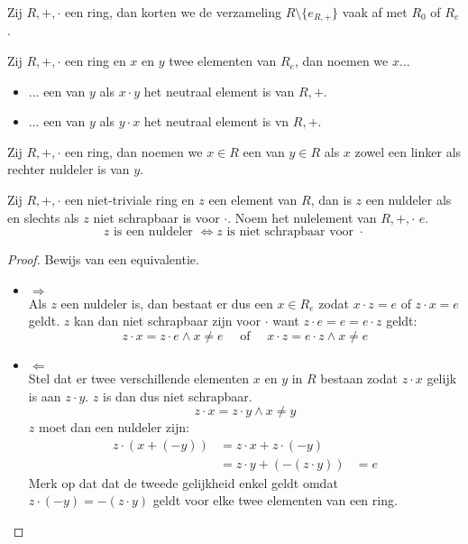 \documentclass[main.tex]{subfiles}
\begin{document}
\begin{de}
  Zij $R,+,\cdot$ een ring, dan korten we de verzameling $R\setminus \{e_{R,+}\}$ vaak af met $R_{0}$ of $R_{e}$.
\end{de}

\begin{de}
  Zij $R,+,\cdot$ een ring en $x$ en $y$ twee elementen van $R_{e}$, dan noemen we $x$...
  \begin{itemize}
  \item ... een  van $y$ als $x\cdot y$ het neutraal element is van $R,+$.
  \item ... een  van $y$ als $y\cdot x$ het neutraal element is vn $R,+$.
  \end{itemize}
\end{de}

\begin{de}
  Zij $R,+,\cdot$ een ring, dan noemen we $x\in R$ een  van $y\in R$ als $x$ zowel een linker als rechter nuldeler is van $y$.
\end{de}

\begin{ei}
  \label{ei:nuldeler-asa-niet-schrapbaar}
  Zij $R,+,\cdot$ een niet-triviale ring en $z$ een element van $R$, dan is $z$ een nuldeler als en slechts als $z$ niet schrapbaar is voor $\cdot$.
  Noem het nulelement van $R,+,\cdot$ $e$.
  \[ z \text{ is een nuldeler } \Leftrightarrow z \text{ is niet schrapbaar voor } \cdot \]
  \begin{proof}
    Bewijs van een equivalentie.
    \begin{itemize}
    \item $\Rightarrow$\\
      Als $z$ een nuldeler is, dan bestaat er dus een $x \in R_{e}$ zodat $x\cdot z= e$ of $z \cdot x = e$ geldt.
      $z$ kan dan niet schrapbaar zijn voor $\cdot$ want $z\cdot e = e = e \cdot z$ geldt:
      \[ z \cdot x = z \cdot e \wedge x \neq e \quad\text{ of }\quad x \cdot z = e \cdot z \wedge x \neq e \]
    \item $\Leftarrow$\\
      Stel dat er twee verschillende elementen $x$ en $y$ in $R$ bestaan zodat $z \cdot x$ gelijk is aan $z \cdot y$.
      $z$ is dan dus niet schrapbaar.
      \[ z \cdot x = z \cdot y \wedge x \neq y \]
      $z$ moet dan een nuldeler zijn:
      \[
      \begin{array}{rll}
        z \cdot (x + (-y)) &= z \cdot x + z \cdot (-y) &\\
                           &= z \cdot y + (-(z \cdot y)) &= e
      \end{array}
      \]
      Merk op dat dat de tweede gelijkheid enkel geldt omdat $z \cdot (-y) = -(z \cdot y)$ geldt voor elke twee elementen van een ring.
    \end{itemize}
  \end{proof}
\end{ei}
\end{document}
